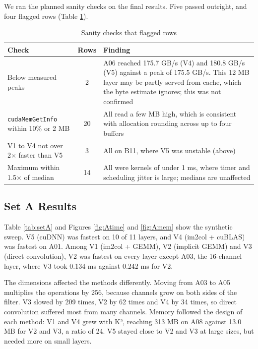 \documentclass[12pt,a4paper]{article}
\newcommand{\gentable}[3][\small]{%
  \begin{table}[H]\centering{#1}\caption{#3}\end{table}}
\begin{document}
\gentable{repeatability}{Kernel-time difference between two full passes\label{tab:repeat}}

We ran the planned sanity checks on the final results. Five passed outright, and four flagged rows (Table \ref{tab:sanity}).

\begin{table}[H]\centering\small
\begin{tabular}{p{5.4cm}cp{7.2cm}}
\hline
\rowcolor{headgrey}\textbf{Check} & \textbf{Rows} & \textbf{Finding} \\ \hline
Below measured peaks & 2 & A06 reached 175.7 GB/s (V4) and 180.8 GB/s (V5) against a peak of 175.5 GB/s. This 12 MB layer may be partly served from cache, which the byte estimate ignores; this was not confirmed \\
\texttt{cudaMemGetInfo} within 10\% or 2 MB & 20 & All read a few MB high, which is consistent with allocation rounding across up to four buffers \\
V1 to V4 not over 2× faster than V5 & 3 & All on B11, where V5 was unstable (above) \\
Maximum within 1.5× of median & 14 & All were kernels of under 1 ms, where timer and scheduling jitter is large; medians are unaffected \\
\hline
\end{tabular}
\caption{Sanity checks that flagged rows}\label{tab:sanity}
\end{table}

\subsection{Set A Results}
Table \ref{tab:setA} and Figures \ref{fig:Atime} and \ref{fig:Amem} show the synthetic sweep. V5 (cuDNN) was fastest on 10 of 11 layers, and V4 (im2col + cuBLAS) was fastest on A01. Among V1 (im2col + GEMM), V2 (implicit GEMM) and V3 (direct convolution), V2 was fastest on every layer except A03, the 16-channel layer, where V3 took 0.134 ms against 0.242 ms for V2.

The dimensions affected the methods differently. Moving from A03 to A05 multiplies the operations by 256, because channels grow on both sides of the filter. V3 slowed by 209 times, V2 by 62 times and V4 by 34 times, so direct convolution suffered most from many channels. Memory followed the design of each method: V1 and V4 grew with K², reaching 313 MB on A08 against 13.0 MB for V2 and V3, a ratio of 24. V5 stayed close to V2 and V3 at large sizes, but needed more on small layers.
\end{document}
